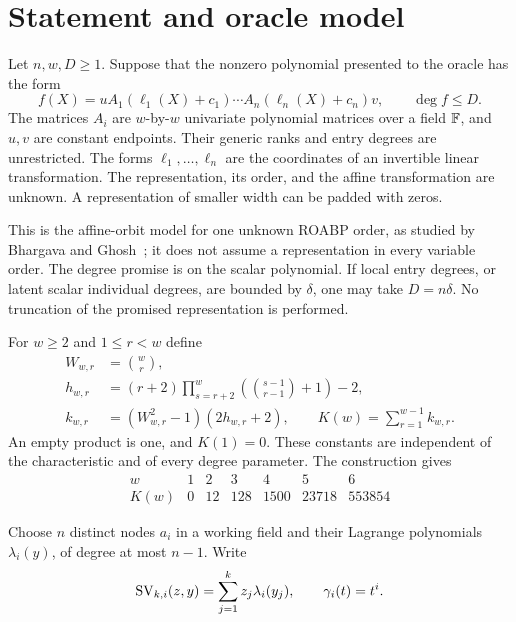 \section{Statement and oracle model}

Let $n,w,D\ge1$. Suppose that the nonzero polynomial presented to the
oracle has the form
\begin{equation}\label{eq:model}
 f(X)=uA_1(\ell_1(X)+c_1)\cdots A_n(\ell_n(X)+c_n)v,
 \qquad \deg f\le D.
\end{equation}
The matrices $A_i$ are $w$-by-$w$ univariate polynomial matrices over
a field $\mathbb F$, and $u,v$ are constant endpoints. Their generic ranks
and entry degrees are unrestricted. The forms $\ell_1,\ldots,\ell_n$
are the coordinates of an invertible linear transformation. The
representation, its order, and the affine transformation are unknown.
A representation of smaller width can be padded with zeros.

This is the affine-orbit model for one unknown ROABP order, as studied
by Bhargava and Ghosh~\cite{BG}; it does not assume a representation
in every variable order. The degree promise is on the scalar polynomial.
If local entry degrees, or latent scalar individual degrees, are bounded
by $\delta$, one may take $D=n\delta$. No truncation of the promised
representation is performed.

For $w\ge2$ and $1\le r<w$ define
\begin{align}
 W_{w,r}&=\binom wr,\label{eq:W}\\
 h_{w,r}&=(r+2)\prod_{s=r+2}^{w}
                    \left(\binom{s-1}{r-1}+1\right)-2,\label{eq:h}\\
 k_{w,r}&=(W_{w,r}^2-1)(2h_{w,r}+2),\qquad
 K(w)=\sum_{r=1}^{w-1}k_{w,r}.\label{eq:K}
\end{align}
An empty product is one, and $K(1)=0$. These constants are independent
of the characteristic and of every degree parameter. The construction gives
\[
 \begin{array}{c|rrrrrr}
 w&1&2&3&4&5&6\\ \hline
 K(w)&0&12&128&1500&23718&553854
 \end{array}
\]

Choose $n$ distinct nodes $a_i$ in a working field and their Lagrange
polynomials $\lambda_i(y)$, of degree at most $n-1$. Write
\[
 \operatorname{SV}_{k,i}(z,y)=\sum_{j=1}^{k}z_j\lambda_i(y_j),\qquad
 \gamma_i(t)=t^i.
\]

